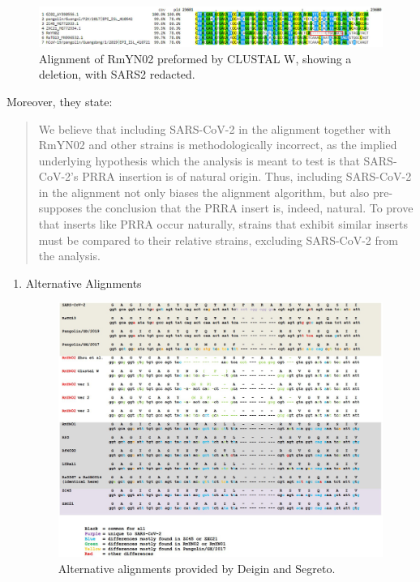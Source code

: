 \documentclass[11pt]{article}
\begin{document}
\begin{enumerate}
\begin{figure}[htbp]
\centering
\includegraphics[width=.9\linewidth]{./images/paa-insertion-underlying-nucleotides-no-ccpvirus.png}
\caption{Alignment of RmYN02 preformed by CLUSTAL W, showing a deletion, with SARS2 redacted.}
\end{figure}

Moreover, they state:
\begin{quote}
We believe that including SARS-CoV-2 in the alignment together with RmYN02 and other strains is methodologically incorrect, as the implied underlying hypothesis which the analysis is meant to test is that SARS-CoV-2’s PRRA insertion is of natural origin. Thus, including SARS-CoV-2 in the alignment not only biases the alignment algorithm, but also pre-supposes the conclusion that the PRRA insert is, indeed, natural. To prove that inserts like PRRA occur naturally, strains that exhibit similar inserts must be compared to their relative strains, excluding SARS-CoV-2 from the analysis.
\end{quote}

\begin{enumerate}
\item Alternative Alignments
\label{sec:orge05fad9}
\begin{figure}[htbp]
\centering
\includegraphics[width=.9\linewidth]{./images/paa-insertion-alternatives.png}
\caption{Alternative alignments provided by Deigin and Segreto.}
\end{figure}


\end{enumerate}
\end{enumerate}
\end{document}
